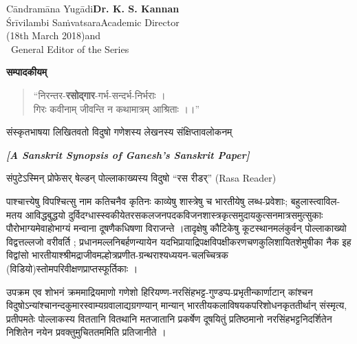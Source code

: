 \bigskip
\noindent
Cāndramāna Yugādi\hfill {\bf Dr. K. S. Kannan}\\
Śrīvilambi Saṁvatsara\hfill Academic Director\\
(18th March 2018)\hfill	and\\
~\phantom{a}\hfill  General Editor of the Series

\newpage

{\large\dev\bfseries सम्पादकीयम् }

\smallskip
 

\label{editorial1}

\begin{quote}
{\dev ``निरन्तर-{\bfseries रसोद्गार}-गर्भ-सन्दर्भ-निर्भराः ।}\\[2pt]
{\dev गिरः कवीनाम् जीवन्ति न कथामात्रम् आश्रिताः ।।''}
\end{quote}
 
{\dev संस्कृतभाषया लिखितवतो विदुषो गणेशस्य लेखनस्य संक्षिप्तावलोकनम्}

\textsl{\textbf{[A Sanskrit Synopsis of Ganesh's Sanskrit Paper]}}


{\dev संपुटेऽस्मिन् प्रोफेसर् षेल्डन् पोल्लाकाख्यस्य विदुषो “रस रीडर्”} (Rasa Reader)

{\dev पाश्चात्त्येषु विपश्चित्सु नाम कतिचनैव कृतिनः काव्येषु शास्त्रेषु च भारतीयेषु लब्ध-प्रवेशाः; बहुलास्त्वाविल-मतय आविद्धबुद्धयो दुर्विदग्धास्स्वकीयेतरसकलजनपदकविजनशास्त्र\-कृत्स\-मुदायकुत्सनमात्रसमुत्सुकाः पौरोभाग्य\-मेवाहोभाग्यं मन्वाना दूषणैकधिषणा विराजन्ते ।\break तादृक्षेषु कौटिकेषु कूटस्थानमलंकुर्वन् पोल्लाकाख्यो विद्वत्तल्लजो वरीवर्ति ; प्रधानमल्लनिबर्ह\-णन्यायेन यदभिप्रायाद्रिपक्षविपक्षीकरणचणकुलिशायितशेमुषीका नैक इह विद्वांसो भारतीया\-श्श्रीमद्राजीवमल्होत्रप्रणीत-ग्रन्थराश्यध्ययन-चलच्चित्रक (विडियो)स्तोमपरिवीक्षणप्राप्त\break\-स्फूर्तिकाः ।}

{\dev उपक्रम एव शोभनं क्रममाद्रियमाणो गणेशो हिरियण्ण-नरसिंहभट्ट-गुण्डप्प-प्रभृतीन्\break कार्णाटान् कांश्चन  विदुषोऽन्यांश्चानन्दकुमारस्वाम्यग्रवालाद्यग्रगण्यान् मान्यान् भारतीयकला\-विषयक\-परिशोधनकृततीर्थान् संस्मृत्य, प्रतीपमतेः पोल्लाकस्य विततानि वितथानि मतजातानि प्रकर्षेण दूषयितुं प्रतिष्ठमानो नरसिंह\-भट्ट\-निदर्शितेन निशितेन नयेन प्रवक्तुमुचिततममिति प्रति\-जानीते ।}

